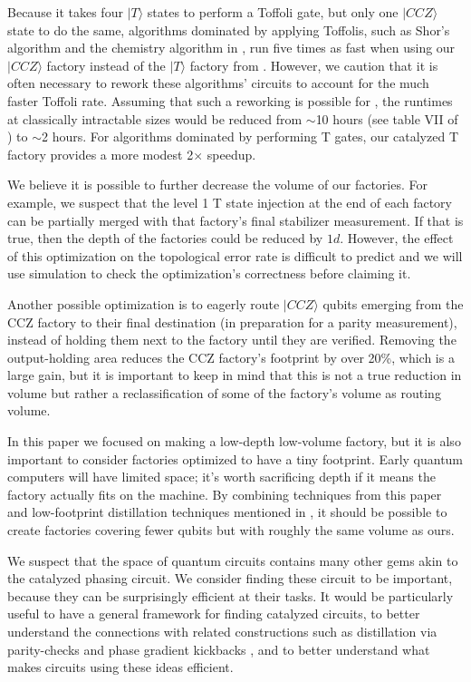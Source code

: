 \documentclass[superscriptaddress,notitlepage,longbibliography]{revtex4-1}
\begin{document}
Because it takes four $|T\rangle$ states to perform a Toffoli gate, but only one $|CCZ\rangle$ state to do the same, algorithms dominated by applying Toffolis, such as Shor's algorithm and the chemistry algorithm in \cite{babbush2018}, run five times as fast when using our $|CCZ\rangle$ factory instead of the $|T\rangle$ factory from \cite{fowler2018}.
However, we caution that it is often necessary to rework these algorithms' circuits to account for the much faster Toffoli rate.
Assuming that such a reworking is possible for \cite{babbush2018}, the runtimes at classically intractable sizes would be reduced from $\sim$10 hours (see table VII of \cite{babbush2018}) to $\sim$2 hours.
For algorithms dominated by performing T gates, our catalyzed T factory provides a more modest 2$\times$ speedup.

We believe it is possible to further decrease the volume of our factories.
For example, we suspect that the level 1 T state injection at the end of each factory can be partially merged with that factory's final stabilizer measurement.
If that is true, then the depth of the factories could be reduced by $1d$.
However, the effect of this optimization on the topological error rate is difficult to predict and we will use simulation to check the optimization's correctness before claiming it.

Another possible optimization is to eagerly route $|CCZ\rangle$ qubits emerging from the CCZ factory to their final destination (in preparation for a parity measurement), instead of holding them next to the factory until they are verified.
Removing the output-holding area reduces the CCZ factory's footprint by over 20\%, which is a large gain, but it is important to keep in mind that this is not a true reduction in volume but rather a reclassification of some of the factory's volume as routing volume.

In this paper we focused on making a low-depth low-volume factory, but it is also important to consider factories optimized to have a tiny footprint.
Early quantum computers will have limited space; it's worth sacrificing depth if it means the factory actually fits on the machine.
By combining techniques from this paper and low-footprint distillation techniques mentioned in \cite{litinski2018}, it should be possible to create factories covering fewer qubits but with roughly the same volume as ours.

We suspect that the space of quantum circuits contains many other gems akin to the catalyzed phasing circuit.
We consider finding these circuit to be important, because they can be surprisingly efficient at their tasks.
It would be particularly useful to have a general framework for finding catalyzed circuits, to better understand the connections with related constructions such as distillation via parity-checks \cite{campbell2018} and phase gradient kickbacks \cite{kitaev2002, gidney2018, nam2018}, and to better understand what makes circuits using these ideas efficient.
\end{document}

